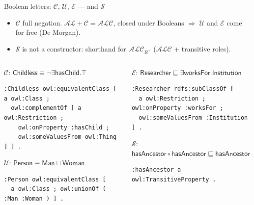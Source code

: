 \documentclass[10pt,aspectratio=169,xcolor=table]{beamer}
\newcommand{\dl}[1]{\ensuremath{\mathcal{#1}}}
\newcommand{\ALC}{\dl{ALC}}
\newcommand{\AL}{\dl{AL}}
\newcommand{\cn}[1]{\mathsf{#1}}
\newcommand{\rn}[1]{\mathsf{#1}}
\newcommand{\sub}{\sqsubseteq}
\newcommand{\eqv}{\equiv}
\begin{document}
\begin{frame}[fragile]{Boolean letters: \dl{C}, \dl{U}, \dl{E} --- and \dl{S}}
  \small
  \begin{itemize}
    \item \textbf{\dl{C}} full negation. $\AL + \dl{C} = \ALC$, closed under Booleans
      $\Rightarrow$ \dl{U} and \dl{E} come for free (De Morgan).
    \item \textbf{\dl{S}} is not a constructor: shorthand for $\ALC_{R^+}$ ($\ALC$ + transitive roles).
  \end{itemize}
  \begin{columns}[T]
    \begin{column}{0.5\textwidth}
      \footnotesize \dl{C}: $\cn{Childless} \eqv \neg \exists \rn{hasChild}.\top$
\begin{lstlisting}
:Childless owl:equivalentClass [ a owl:Class ;
  owl:complementOf [ a owl:Restriction ;
    owl:onProperty :hasChild ;
    owl:someValuesFrom owl:Thing ] ] .
\end{lstlisting}
      \footnotesize \dl{U}: $\cn{Person} \eqv \cn{Man} \sqcup \cn{Woman}$
\begin{lstlisting}
:Person owl:equivalentClass [
  a owl:Class ; owl:unionOf ( :Man :Woman ) ] .
\end{lstlisting}
    \end{column}
    \begin{column}{0.46\textwidth}
      \footnotesize \dl{E}: $\cn{Researcher} \sub \exists \rn{worksFor}.\cn{Institution}$
\begin{lstlisting}
:Researcher rdfs:subClassOf [
  a owl:Restriction ; owl:onProperty :worksFor ;
  owl:someValuesFrom :Institution ] .
\end{lstlisting}
      \footnotesize \dl{S}: $\rn{hasAncestor} \circ \rn{hasAncestor} \sub \rn{hasAncestor}$
\begin{lstlisting}
:hasAncestor a owl:TransitiveProperty .
\end{lstlisting}
    \end{column}
  \end{columns}
\end{frame}
\end{document}
